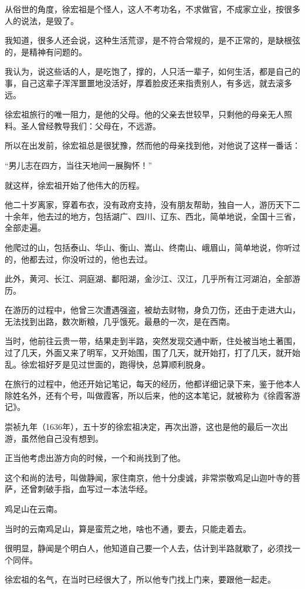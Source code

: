\begin{multicols}{\theparacolNo}
从俗世的角度，徐宏祖是个怪人，这人不考功名，不求做官，不成家立业，按很多人的说法，是毁了。

我知道，很多人还会说，这种生活荒谬，是不符合常规的，是不正常的，是缺根弦的，是精神有问题的。

我认为，说这些话的人，是吃饱了，撑的，人只活一辈子，如何生活，都是自己的事，自己这辈子浑浑噩噩地没活好，厚着脸皮还来指责别人，有多远，就去滚多远。

徐宏祖旅行的唯一阻力，是他的父母。他的父亲去世较早，只剩他的母亲无人照料。圣人曾经教导我们：父母在，不远游。

所以在出发前，徐宏祖总是很犹豫，然而他的母亲找到他，对他说了这样一番话：

“男儿志在四方，当往天地间一展胸怀！”

就这样，徐宏祖开始了他伟大的历程。

他二十岁离家，穿着布衣，没有政府支持，没有朋友帮助，独自一人，游历天下二十余年，他去过的地方，包括湖广、四川、辽东、西北，简单地说，全国十三省，全部走遍。

他爬过的山，包括泰山、华山、衡山、嵩山、终南山、峨眉山，简单地说，你听过的，他都去过，你没听过的，他也去过。

此外，黄河、长江、洞庭湖、鄱阳湖，金沙江、汉江，几乎所有江河湖泊，全部游历。

在游历的过程中，他曾三次遭遇强盗，被劫去财物，身负刀伤，还由于走进大山，无法找到出路，数次断粮，几乎饿死。最悬的一次，是在西南。

当时，他前往云贵一带，结果走到半路，突然发现交通中断，住处被当地土著围，过了几天，外面又来了明军，又开始围，围了几天，就开始打，打了几天，就开始乱。徐宏祖好歹是见过世面的，跑得快，总算顺利脱身。

在旅行的过程中，他还开始记笔记，每天的经历，他都详细记录下来，鉴于他本人除姓名外，还有个号，叫做霞客，所以后来，他的这本笔记，就被称为《徐霞客游记》。

崇祯九年（1636年），五十岁的徐宏祖决定，再次出游，这也是他的最后一次出游，虽然他自己没有想到。

正当他考虑出游方向的时候，一个和尚找到了他。

这个和尚的法号，叫做静闻，家住南京，他十分虔诚，非常崇敬鸡足山迦叶寺的菩萨，还曾刺破手指，血写过一本法华经。

鸡足山在云南。

当时的云南鸡足山，算是蛮荒之地，啥也不通，要去，只能走着去。

很明显，静闻是个明白人，他知道自己要一个人去，估计到半路就歇了，必须找一个同伴。

徐宏祖的名气，在当时已经很大了，所以他专门找上门来，要跟他一起走。


\end{multicols}
